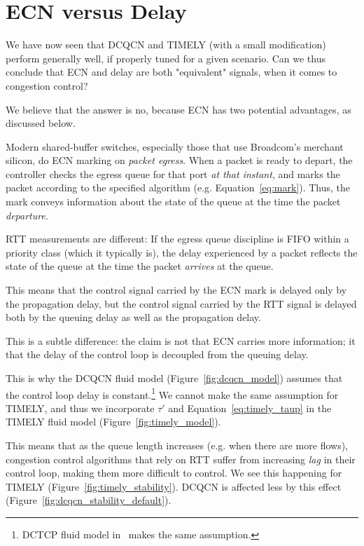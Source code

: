 \vspace{-1em}
\section {ECN versus Delay}
\label{sec:discuss}

We have now seen that DCQCN and TIMELY (with a small modification) perform
generally well, if properly tuned for a given scenario. Can we thus conclude
that ECN and delay are both "equivalent" signals, when it comes to congestion
control? 

We believe that the answer is no, because ECN has two potential advantages, as
discussed below.

Modern shared-buffer switches, especially those that use Broadcom's merchant
silicon, do ECN marking on {\em packet egress}. When a packet is ready to
depart, the controller checks the egress queue for that port {\em at that
instant}, and marks the packet according to the specified algorithm
(e.g.  Equation~\ref{eq:mark}). Thus, the mark conveys information about the
state of the queue at the time the packet {\em departure}.

RTT measurements are different: If the egress queue discipline is FIFO within a
priority class (which it typically is), the delay experienced by a packet
reflects the state of the queue at the time the packet {\em arrives} at the
queue. 

This means that the control signal carried by the ECN mark is delayed only by
the propagation delay, but the control signal carried by the RTT signal is
delayed both by the queuing delay as well as the propagation delay. 

This is a subtle difference: the claim is not that ECN carries more information;
it that the delay of the control loop is decoupled from the queuing delay.

This is why the DCQCN fluid model (Figure~\ref{fig:dcqcn_model}) assumes that
the control loop delay is constant.\footnote{DCTCP fluid model
in~\cite{dctcp-analysis} makes the same assumption.} We cannot make the same
assumption for TIMELY, and  thus we incorporate $\tau'$ and
Equation~\ref{eq:timely_taup} in the TIMELY fluid model
(Figure~\ref{fig:timely_model}).

This means that as the queue length increases (e.g. when there are
more flows), congestion control algorithms that rely on RTT suffer from
increasing {\em lag} in their control loop, making them more difficult to control. We see this
happening for TIMELY (Figure~\ref{fig:timely_stability}). DCQCN is
affected less by  this
effect (Figure~\ref{fig:dcqcn_stability_default}).

